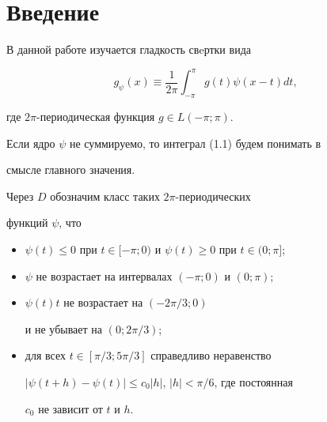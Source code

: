 \maketitle


\label{begin}








\section{Введение}





В данной работе изучается гладкость свeртки вида


\begin{equation}


g_\psi(x)\equiv\frac{1}{2\pi}\int_{-\pi}^\pi g(t)\psi(x-t)dt,


\end{equation}


где $2\pi$-периодическая функция $g\in L(-\pi;\pi)$.


Если ядро $\psi$ не суммируемо, то интеграл (1.1) будем понимать в


смысле главного значения.





Через $D$ обозначим класс таких $2\pi$-периодических


функций $\psi$, что


\begin{itemize}


\item[а)] $\psi(t)\le0$ при $t\in[-\pi;0)$ и $\psi(t)\ge0$ при $t\in(0;\pi]$;


\item[б)] $\psi$ не возрастает на интервалах $(-\pi;0)$ и $(0;\pi)$;


\item[в)] $\psi(t)t$ не возрастает на $(-2\pi/3;0)$


и не убывает на $(0;2\pi/3)$;


\item[г)] для всех $t\in [\pi/3;5\pi/3]$ справедливо неравенство


$|\psi(t+h)-\psi(t)|\le c_0|h|$, $|h|<\pi/6$, где постоянная


$c_0$ не зависит от $t$ и $h$.


\end{itemize}


